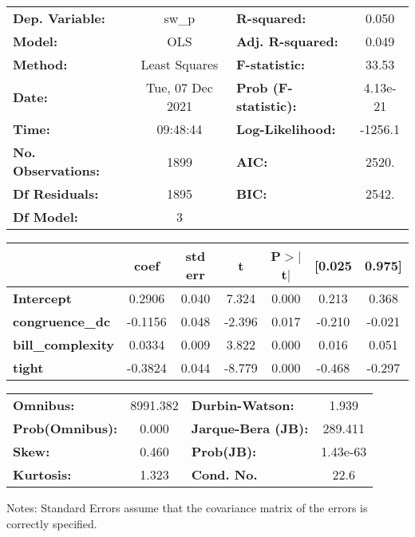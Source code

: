 \begin{center}
\begin{tabular}{lclc}
\toprule
\textbf{Dep. Variable:}    &      sw\_p       & \textbf{  R-squared:         } &     0.050   \\
\textbf{Model:}            &       OLS        & \textbf{  Adj. R-squared:    } &     0.049   \\
\textbf{Method:}           &  Least Squares   & \textbf{  F-statistic:       } &     33.53   \\
\textbf{Date:}             & Tue, 07 Dec 2021 & \textbf{  Prob (F-statistic):} &  4.13e-21   \\
\textbf{Time:}             &     09:48:44     & \textbf{  Log-Likelihood:    } &   -1256.1   \\
\textbf{No. Observations:} &        1899      & \textbf{  AIC:               } &     2520.   \\
\textbf{Df Residuals:}     &        1895      & \textbf{  BIC:               } &     2542.   \\
\textbf{Df Model:}         &           3      & \textbf{                     } &             \\
\bottomrule
\end{tabular}
\begin{tabular}{lcccccc}
                          & \textbf{coef} & \textbf{std err} & \textbf{t} & \textbf{P$> |$t$|$} & \textbf{[0.025} & \textbf{0.975]}  \\
\midrule
\textbf{Intercept}        &       0.2906  &        0.040     &     7.324  &         0.000        &        0.213    &        0.368     \\
\textbf{congruence\_dc}   &      -0.1156  &        0.048     &    -2.396  &         0.017        &       -0.210    &       -0.021     \\
\textbf{bill\_complexity} &       0.0334  &        0.009     &     3.822  &         0.000        &        0.016    &        0.051     \\
\textbf{tight}            &      -0.3824  &        0.044     &    -8.779  &         0.000        &       -0.468    &       -0.297     \\
\bottomrule
\end{tabular}
\begin{tabular}{lclc}
\textbf{Omnibus:}       & 8991.382 & \textbf{  Durbin-Watson:     } &    1.939  \\
\textbf{Prob(Omnibus):} &   0.000  & \textbf{  Jarque-Bera (JB):  } &  289.411  \\
\textbf{Skew:}          &   0.460  & \textbf{  Prob(JB):          } & 1.43e-63  \\
\textbf{Kurtosis:}      &   1.323  & \textbf{  Cond. No.          } &     22.6  \\
\bottomrule
\end{tabular}
\end{center}

Notes: \newline
 [1] Standard Errors assume that the covariance matrix of the errors is correctly specified.